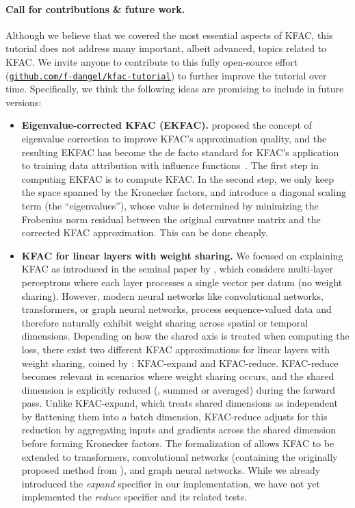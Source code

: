 \paragraph{Call for contributions \& future work.} Although we believe that we covered the most essential aspects of KFAC, this tutorial does not address many important, albeit advanced, topics related to KFAC.
We invite anyone to contribute to this fully open-source effort (\href{\repourl}{\texttt{github.com/f-dangel/kfac-tutorial}}) to further improve the tutorial over time.
Specifically, we think the following ideas are promising to include in future versions:
\begin{itemize}
\item \textbf{Eigenvalue-corrected KFAC (EKFAC).}
  \citet{george2018fast} proposed the concept of eigenvalue correction to improve KFAC's approximation quality, and the resulting EKFAC has become the de facto standard for KFAC's application to training data attribution with influence functions~\cite{grosse2023studying,mlodozeniec2025influence}.
  The first step in computing EKFAC is to compute KFAC.
  In the second step, we only keep the space spanned by the Kronecker factors, and introduce a diagonal scaling term (the ``eigenvalues''), whose value is determined by minimizing the Frobenius norm residual between the original curvature matrix and the corrected KFAC approximation.
  This can be done cheaply.

\item \textbf{KFAC for linear layers with weight sharing.}
  We focused on explaining KFAC as introduced in the seminal paper by \citet{martens2015optimizing}, which considers multi-layer perceptrons where each layer processes a single vector per datum (\ie no weight sharing).
  However, modern neural networks like convolutional networks, transformers, or graph neural networks, process sequence-valued data and therefore naturally exhibit weight sharing across spatial or temporal dimensions.
  Depending on how the shared axis is treated when computing the loss, there exist two different KFAC approximations for linear layers with weight sharing, coined by \citet{eschenhagen2023kroneckerfactored}: KFAC-expand and KFAC-reduce.
  KFAC-reduce becomes relevant in scenarios where weight sharing occurs, and the shared dimension is explicitly reduced (\eg, summed or averaged) during the forward pass.
  Unlike KFAC-expand, which treats shared dimensions as independent by flattening them into a batch dimension, KFAC-reduce adjusts for this reduction by aggregating inputs and gradients across the shared dimension before forming Kronecker factors.
  The formalization of \citet{eschenhagen2023kroneckerfactored} allows KFAC to be extended to transformers, convolutional networks (containing the originally proposed method from \citet{grosse2016kroneckerfactored}), and graph neural networks.
  While we already introduced the \emph{expand} specifier in our implementation, we have not yet implemented the \emph{reduce} specifier and its related tests.


\end{itemize}
